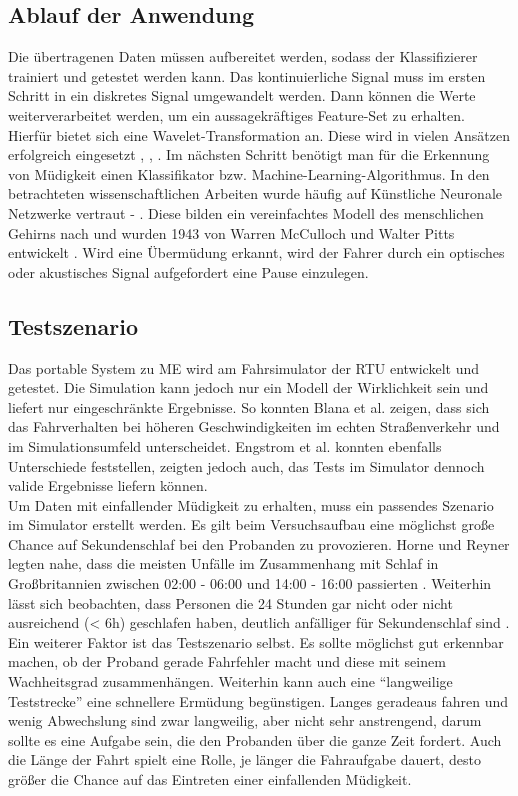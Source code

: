{\subsection{Ablauf der Anwendung}
Die übertragenen Daten müssen aufbereitet werden, sodass der Klassifizierer trainiert und getestet werden kann. Das kontinuierliche Signal muss im ersten Schritt in ein diskretes Signal umgewandelt werden. Dann können die Werte weiterverarbeitet werden, um ein aussagekräftiges Feature-Set zu erhalten. Hierfür bietet sich eine Wavelet-Transformation \cite{Chui:1992:IW:163196} an. Diese wird in vielen Ansätzen erfolgreich eingesetzt \cite{zhang_6513058}, \cite{Khushaba_5580017}, \cite{Subasi:2005:ARA:1707423.1707550}. 
Im nächsten Schritt benötigt man für die Erkennung von Müdigkeit einen Klassifikator bzw. Machine-Learning-Algorithmus. In den betrachteten wissenschaftlichen Arbeiten wurde häufig auf Künstliche Neuronale Netzwerke vertraut \cite{wilson_890161} - \cite{Murthy_1}. Diese bilden ein vereinfachtes Modell des menschlichen Gehirns nach und wurden 1943 von Warren McCulloch und Walter Pitts entwickelt \cite{ann}.
Wird eine Übermüdung erkannt, wird der Fahrer durch ein optisches oder akustisches Signal aufgefordert eine Pause einzulegen.

\subsection{Testszenario}
\label{sec:scene}
Das portable System zu \acl{ME} wird am Fahrsimulator der \acl{RTU} entwickelt und getestet. Die Simulation kann jedoch nur ein Modell der Wirklichkeit sein und liefert nur eingeschränkte Ergebnisse. So konnten Blana et al. \cite{Blana_1} zeigen, dass sich das Fahrverhalten bei höheren Geschwindigkeiten im echten Straßenverkehr und im Simulationsumfeld unterscheidet. Engstrom et al.  \cite{Engstrom_2322937} konnten ebenfalls Unterschiede feststellen, zeigten jedoch auch, das Tests im Simulator dennoch valide Ergebnisse liefern können. \\

Um Daten mit einfallender Müdigkeit zu erhalten, muss ein passendes Szenario im Simulator erstellt werden. Es gilt beim Versuchsaufbau eine möglichst große Chance auf Sekundenschlaf bei den Probanden zu provozieren. Horne und Reyner legten nahe, dass die meisten Unfälle im Zusammenhang mit Schlaf in Großbritannien zwischen 02:00 - 06:00 und 14:00 - 16:00 passierten \cite{Horne_1757738}. Weiterhin lässt sich beobachten, dass Personen die 24 Stunden gar nicht oder nicht ausreichend (< 6h) geschlafen haben, deutlich anfälliger für Sekundenschlaf sind \cite{Peters_1}. 
Ein weiterer Faktor ist das Testszenario selbst. Es sollte möglichst gut erkennbar machen, ob der Proband gerade Fahrfehler macht und diese mit seinem Wachheitsgrad zusammenhängen. Weiterhin kann auch eine "`langweilige Teststrecke"' eine schnellere Ermüdung begünstigen. Langes geradeaus fahren und wenig Abwechslung sind zwar langweilig, aber nicht sehr anstrengend, darum sollte es eine Aufgabe sein, die den Probanden über die ganze Zeit fordert. Auch die Länge der Fahrt spielt eine Rolle, je länger die Fahraufgabe dauert, desto größer die Chance auf das Eintreten einer einfallenden Müdigkeit. \\

}
